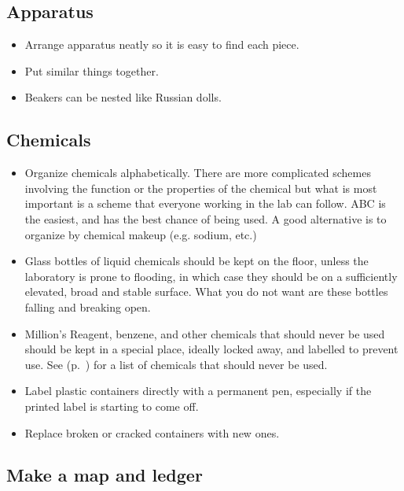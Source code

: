 \subsection{Apparatus}
\begin{itemize}
\item{Arrange apparatus neatly so it is easy to find each piece.}
\item{Put similar things together.}
\item{Beakers can be nested like Russian dolls.}
\end{itemize}

\subsection{Chemicals}
\begin{itemize}
\item{Organize chemicals alphabetically. 
There are more complicated schemes involving the function 
or the properties of the chemical but what is most important 
is a scheme that everyone working in the lab can follow. 
ABC is the easiest, 
and has the best chance of being used. A good alternative is to organize by chemical makeup (e.g. sodium, etc.)}
\item{Glass bottles of liquid chemicals should be kept on the floor, 
unless the laboratory is prone to flooding, 
in which case they should be on a sufficiently elevated, 
broad and stable surface. 
What you do not want are these bottles falling and breaking open.}
\item{Million's Reagent, 
benzene, 
and other chemicals that should never be used should be kept in a special place, 
ideally locked away, 
and labelled to prevent use. 
See  (p.~\pageref{cha:dangerchem}) for a list of chemicals that should never be used.}
\item{Label plastic containers directly with a permanent pen, 
especially if the printed label is starting to come off.} 
\item{Replace broken or cracked containers with new ones.}
\end{itemize}

\subsection{Make a map and ledger}

